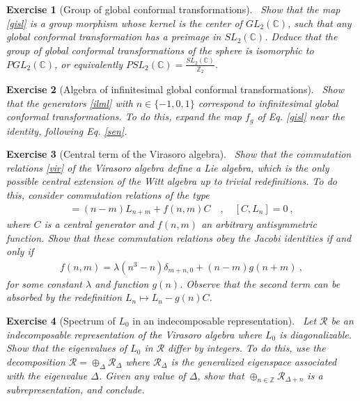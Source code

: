 \documentclass[12pt, a4paper, notitlepage, twoside]{report}
\numberwithin{equation}{section}
\theoremstyle{break}
\newtheorem{exo}{Exercise}[chapter]
\begin{document}
\begin{exo}[Group of global conformal transformations]
 ~\label{exoiso}
Show that the map \eqref{gisl} is a group morphism whose kernel is the center of $GL_2({\mathbb{C}})$, such that any global conformal transformation has a preimage in $SL_2(\mathbb{C})$.
Deduce that the group of global conformal transformations of the sphere is isomorphic to $PGL_2({\mathbb{C}})$, or equivalently $PSL_2(\mathbb{C}) = \frac{SL_2(\mathbb{C})}{\mathbb{Z}_2}$.
\end{exo}

\begin{exo}[Algebra of infinitesimal global conformal transformations]
 ~\label{exomoz}
Show that the generators \eqref{ilml} with $n\in\{-1,0,1\}$ correspond to infinitesimal global conformal transformations.
To do this, expand the map $f_g$ of Eq. \eqref{gisl} near the identity, following Eq. \eqref{sen}.
\end{exo}


\begin{exo}[Central term of the Virasoro algebra]
~\label{exovir}
 Show that the commutation relations \eqref{vir} of the Virasoro algebra define a Lie algebra, which is the only possible central extension of the Witt algebra up to trivial redefinitions.
To do this, consider commutation relations of the type
\begin{align}
 [L_n,L_m] =(n-m)L_{n+m} + f(n,m) C  \quad , \quad [C,L_n]=0\ ,
\end{align}
where $C$ is a central generator and $f(n,m)$ an arbitrary antisymmetric function.
Show that these commutation relations obey the Jacobi identities if and only if 
\begin{align}
 f(n,m) = \lambda (n^3-n)\delta_{m+n,0} + (n-m)g(n+m)\ ,
\end{align}
for some constant $\lambda$ and function $g(n)$.
Observe that the second term can be absorbed by the redefinition $L_n\mapsto L_n-g(n)C$.
\end{exo}

\begin{exo}[Spectrum of $L_0$ in an indecomposable representation]
 ~\label{exodiffint}
 Let $\mathcal{R}$ be an indecomposable representation of the Virasoro algebra where $L_0$ is diagonalizable. 
Show that the eigenvalues of $L_0$ in  $\mathcal{R}$ differ by integers.
To do this, use the decomposition $\mathcal{R}=\oplus_\Delta \mathcal{R}_\Delta$ where $\mathcal{R}_\Delta$ is the generalized eigenspace associated with the eigenvalue $\Delta$.
Given any value of $\Delta$, show that  $\oplus_{n\in{\mathbb{Z}}} \mathcal{R}_{\Delta+n}$ is a subrepresentation, and conclude. 
\end{exo}
\end{document}

